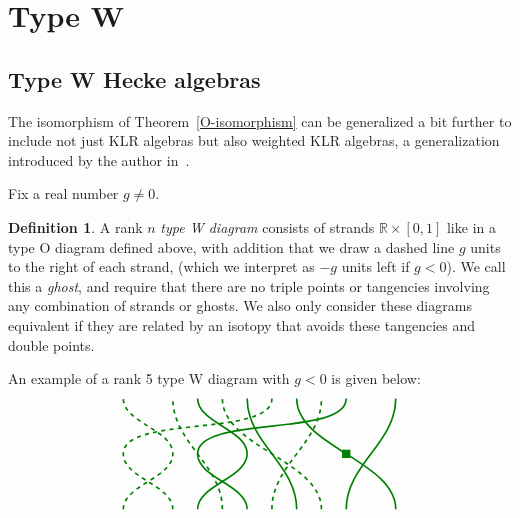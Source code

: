 \documentclass[10pt]{article}
\theoremstyle{definition}
\newtheorem{defi}[theorem]{Definition}
\newcommand{\ck}{g}
\newcommand{\R}{\mathbb{R}}
\begin{document}
\section{Type W}
\label{sec:weight-gener}

\subsection{Type W Hecke algebras}
\label{sec:type-w-hecke}


The isomorphism of Theorem~\ref{O-isomorphism} can be generalized a bit further to include not just KLR
algebras but also weighted KLR algebras, a generalization introduced
by the author in~\cite{WebwKLR}. 

Fix a real number $\ck\neq 0$. 
\begin{defi}
A rank $n$ \emph{type W diagram} consists of strands $\R\times [0,1]$ like in a type O
diagram defined above, with addition that we draw a dashed line $\ck$
units to the right of each strand, (which we interpret as $-\ck$ units
left if $\ck<0$). We call this a \emph{ghost}, and require that there are no
triple points or tangencies involving any combination of strands or
ghosts. We also only consider these diagrams equivalent if they are related by
an isotopy that avoids these tangencies and double points.
\end{defi}
An example of a rank 5 type W diagram with $g<0$ is given below:
\[
\begin{tikzpicture}[baseline,very thick,green!50!black, xscale=2.5,yscale=1.4]
 \draw (-.5,-1) to[out=90,in=-90] (-1,0) to[out=90,in=-90](.5,1);
 \draw[dashed] (-1.25,-1) to[out=90,in=-90] (-1.75,0) to[out=90,in=-90](-.25,1);
 \draw (.5,-1) to[out=90,in=-90] (1,1);
 \draw[dashed] (-.25,-1) to[out=90,in=-90] (.25,1);
 \draw (1,-1) to[out=90,in=-90] 
 node[midway,fill=green!50!black,inner sep=3pt]{} (0,1);
 \draw[dashed] (.25,-1) to[out=90,in=-90] (-.75,1);
 \draw (-1, -1) to[out=90,in=-90] (-.5,0) to[out=90,in=-90] (-1,1);
 \draw (0,-1) to[out=90,in=-90] (-.5,1);
 \draw[dashed] (-1.75, -1) to[out=90,in=-90] (-1.25,0) to[out=90,in=-90] (-1.75,1);
 \draw[dashed] (-.75,-1) to[out=90,in=-90] (-1.25,1);
\end{tikzpicture}\]
\end{document}
